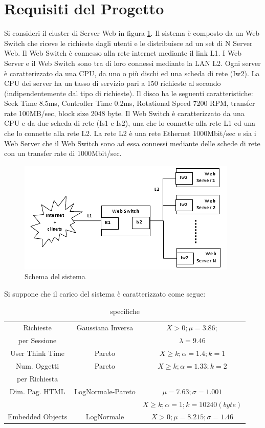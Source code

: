 \section{Requisiti del Progetto}
Si consideri il cluster di Server Web in figura \ref{schema1}. Il sistema è composto da un Web Switch che riceve le richieste dagli utenti e le distribuisce ad un set di N Server Web. Il Web Switch è connesso alla rete internet mediante il link L1. I Web Server e il Web Switch sono tra di loro connessi mediante la LAN L2. 
Ogni server è caratterizzato da una CPU, da uno o più dischi ed una scheda di rete (Iw2). La CPU dei server ha un tasso di servizio pari a 150 richieste al secondo (indipendentemente dal tipo di richieste). Il disco ha le seguenti caratteristiche: Seek Time 8.5ms, Controller Time 0.2ms, Rotational Speed 7200 RPM, transfer rate 100MB/sec, block size 2048 byte. 
Il Web Switch è caratterizzato da una CPU e da due scheda di rete (Is1 e Is2), una che lo connette alla rete L1 ed una che lo connette alla rete L2. 
La rete L2 è una rete Ethernet 1000Mbit/sec e sia i Web Server che il Web Switch sono ad essa connessi mediante delle schede di rete con un transfer rate di 1000Mbit/sec. 
\begin{figure}[H]
\begin{center}
\includegraphics[scale=1.2]{etc/schema1.png}
\caption{Schema del sistema}
\label{schema1}
\end{center}
\end{figure}
Si suppone che il carico del sistema è caratterizzato come segue:
\begin{table}[H]
\begin{center}
\begin{tabular}{||c|c|c||}
\hline
Richieste 	&Gaussiana Inversa			&$X > 0; \mu = 3.86;$\\
per Sessione & 							&$\lambda = 9.46$\\
\hline
\hline
User Think Time				&Pareto		&$X \geq k; \alpha=1.4; k = 1$\\
\hline
Num. Oggetti 	&Pareto		&$X \geq k; \alpha=1.33; k = 2$\\
per Richiesta	&			&\\							
\hline
Dim. Pag. HTML	&LogNormale-Pareto	&$\mu = 7.63; \sigma = 1.001$ \\
					&					&$X \geq k; \alpha=1; k = 10240 (byte)$\\
\hline
Embedded Objects	&LogNormale			&$X > 0; \mu = 8.215; \sigma = 1.46$\\
\hline
\end{tabular}
\end{center}
\caption{specifiche}
\label{test_1}
\end{table}
